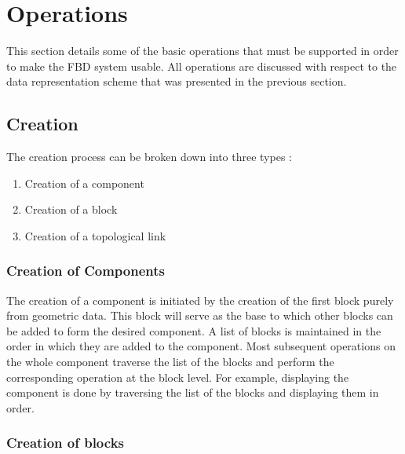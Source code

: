 	\section{Operations}

	This section details some of the basic operations that must be supported
	in order to make the FBD system usable. All operations are discussed with
	respect to the data representation scheme that was presented in the 
	previous section.

	\subsection{Creation}

		The creation process can be broken down into three types :
		\begin{enumerate}
		\item
		Creation of a component
		\item
		Creation of a block
		\item
		Creation of a topological link
		\end{enumerate}

		\subsubsection{Creation of Components}
		
		The creation of a component is initiated by the creation of the first
		block purely from geometric data. This block will serve as the base to
		which other blocks can be added to form the desired component. 
		A list of blocks is maintained in the order in which they are added to 
		the 
		component. Most subsequent operations on the whole component traverse 
		the list of the blocks and perform the corresponding 
		operation at the block level. For example, displaying the component is 
		done by traversing the list of the blocks and displaying them in 
		order.

		\subsubsection{Creation of blocks}

